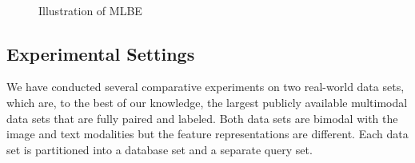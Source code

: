 \begin{figure}[t]
\\
\vspace{-0.3cm}
\caption{Illustration of \mbox{MLBE}}
\label{mlbe:fig:toy-compare}
\vspace{-0.4cm}
\end{figure}


\subsection{Experimental Settings}
\label{sec:exps:settings}

We have conducted several comparative experiments on two real-world data sets, which are, to the best of our knowledge, the largest publicly available multimodal data sets that are fully paired and labeled.  Both data sets are bimodal with the image and text modalities but the feature representations are different.  Each data set is partitioned into a database set and a separate query set.


